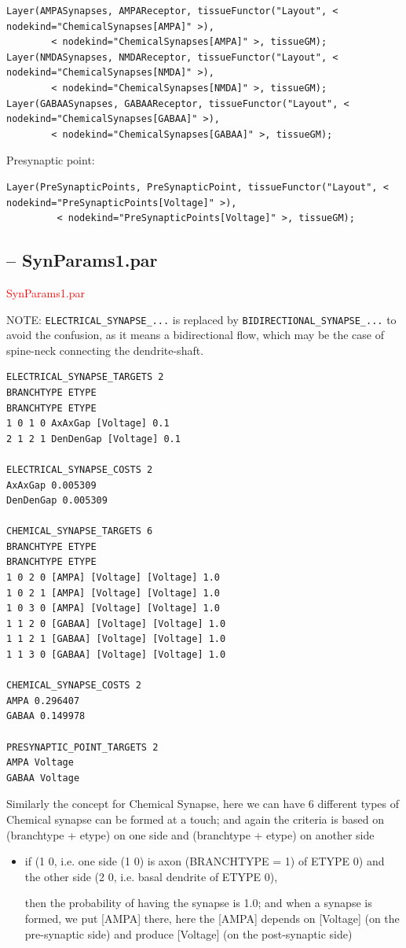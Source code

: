 {\tiny
\begin{verbatim}
Layer(AMPASynapses, AMPAReceptor, tissueFunctor("Layout", < nodekind="ChemicalSynapses[AMPA]" >), 
        < nodekind="ChemicalSynapses[AMPA]" >, tissueGM);
Layer(NMDASynapses, NMDAReceptor, tissueFunctor("Layout", < nodekind="ChemicalSynapses[NMDA]" >), 
        < nodekind="ChemicalSynapses[NMDA]" >, tissueGM);
Layer(GABAASynapses, GABAAReceptor, tissueFunctor("Layout", < nodekind="ChemicalSynapses[GABAA]" >), 
        < nodekind="ChemicalSynapses[GABAA]" >, tissueGM);
\end{verbatim}
}


Presynaptic point:
{\tiny
\begin{verbatim}
Layer(PreSynapticPoints, PreSynapticPoint, tissueFunctor("Layout", < nodekind="PreSynapticPoints[Voltage]" >), 
         < nodekind="PreSynapticPoints[Voltage]" >, tissueGM);
\end{verbatim}
}

\subsection{-- SynParams1.par}

\textcolor{red}{SynParams1.par}

NOTE: \verb!ELECTRICAL_SYNAPSE_...! is replaced
by \verb!BIDIRECTIONAL_SYNAPSE_...! to avoid the confusion, as it means a
bidirectional flow, which may be the case of spine-neck connecting the
dendrite-shaft.

\begin{verbatim}
ELECTRICAL_SYNAPSE_TARGETS 2
BRANCHTYPE ETYPE
BRANCHTYPE ETYPE
1 0 1 0 AxAxGap [Voltage] 0.1
2 1 2 1 DenDenGap [Voltage] 0.1

ELECTRICAL_SYNAPSE_COSTS 2
AxAxGap 0.005309
DenDenGap 0.005309

CHEMICAL_SYNAPSE_TARGETS 6
BRANCHTYPE ETYPE
BRANCHTYPE ETYPE
1 0 2 0 [AMPA] [Voltage] [Voltage] 1.0
1 0 2 1 [AMPA] [Voltage] [Voltage] 1.0
1 0 3 0 [AMPA] [Voltage] [Voltage] 1.0
1 1 2 0 [GABAA] [Voltage] [Voltage] 1.0
1 1 2 1 [GABAA] [Voltage] [Voltage] 1.0
1 1 3 0 [GABAA] [Voltage] [Voltage] 1.0

CHEMICAL_SYNAPSE_COSTS 2
AMPA 0.296407
GABAA 0.149978

PRESYNAPTIC_POINT_TARGETS 2
AMPA Voltage
GABAA Voltage
\end{verbatim}

Similarly the concept for Chemical Synapse, here we can have 6 different types
of Chemical synapse can be formed at a touch; and again the criteria is based on
(branchtype + etype) on one side and (branchtype + etype) on another side
\begin{itemize}
  \item if (1 0, i.e. one side (1 0) is axon (BRANCHTYPE = 1) of ETYPE 0) and
  the other side (2 0, i.e. basal dendrite of ETYPE 0), 
  
  then the probability of having the synapse is 1.0; and when a synapse is
  formed, we put [AMPA] there, here the [AMPA] depends on [Voltage] (on the
  pre-synaptic side) and produce [Voltage] (on the post-synaptic side)
\end{itemize}

